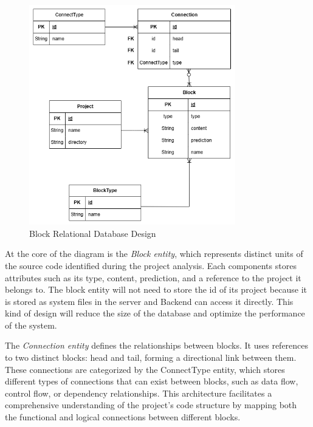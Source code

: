 \begin{figure}[H]
	\centering
	\includegraphics[width=0.8\textwidth]{images/DB block design.drawio.png}
	\caption{Block Relational Database Design}
	\label{fig:block-erd}
\end{figure}

\hspace{0.5cm}At the core of the diagram is the \textit{Block entity}, which represents distinct units of the source code identified during the project analysis. Each components stores attributes such as its type, content, prediction, and a reference to the project it belongs to. The block entity will not need to store the id of its project because it is stored as system files in the server and Backend can access it directly. This kind of design will reduce the size of the database and optimize the performance of the system.

\hspace{0.5cm} The \textit{Connection entity} defines the relationships between blocks. It uses references to two distinct blocks: head and tail, forming a directional link between them. These connections are categorized by the ConnectType entity, which stores different types of connections that can exist between blocks, such as data flow, control flow, or dependency relationships. This architecture facilitates a comprehensive understanding of the project's code structure by mapping both the functional and logical connections between different blocks.


